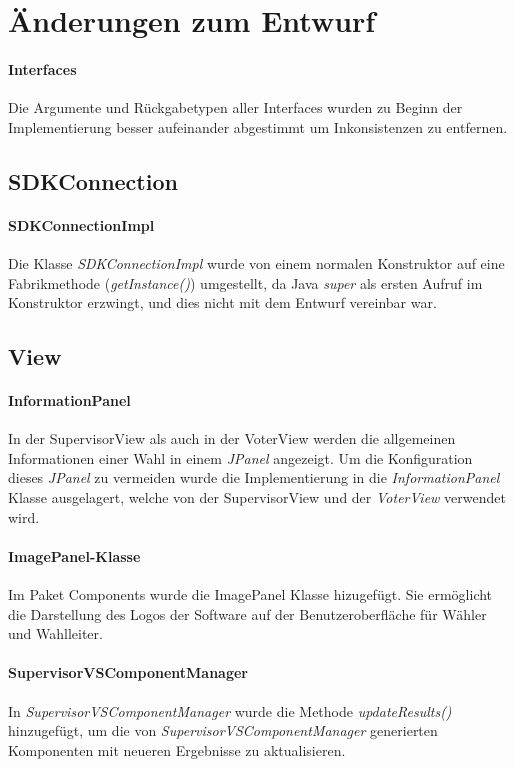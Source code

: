 \documentclass[parskip=full]{scrartcl}
\begin{document}
\section{Änderungen zum Entwurf}
\paragraph{Interfaces}
Die Argumente und Rückgabetypen aller Interfaces wurden zu Beginn der Implementierung besser aufeinander abgestimmt um Inkonsistenzen zu entfernen.

\subsection{SDKConnection}

\paragraph{SDKConnectionImpl}
Die Klasse \textit{SDKConnectionImpl} wurde von einem normalen Konstruktor auf eine Fabrikmethode (\textit{getInstance()}) umgestellt, da Java \textit{super} als ersten Aufruf im Konstruktor erzwingt, und dies nicht mit dem Entwurf vereinbar war.

\subsection{View}

\paragraph{InformationPanel}
In der SupervisorView als auch in der VoterView werden die allgemeinen Informationen einer Wahl in einem \textit{JPanel} angezeigt. Um die Konfiguration dieses \textit{JPanel} zu vermeiden wurde die Implementierung in die \textit{InformationPanel} Klasse ausgelagert, welche von der SupervisorView und der \textit{VoterView} verwendet wird.

\paragraph{ImagePanel-Klasse}
Im Paket Components wurde die ImagePanel Klasse hizugefügt. Sie ermöglicht die Darstellung des Logos der Software auf der Benutzeroberfläche für Wähler und Wahlleiter. 

\paragraph{SupervisorVSComponentManager}
In \textit{SupervisorVSComponentManager} wurde die Methode \textit{updateResults()} hinzugefügt, um die von \textit{SupervisorVSComponentManager} generierten Komponenten mit neueren Ergebnisse zu aktualisieren.
\end{document}

